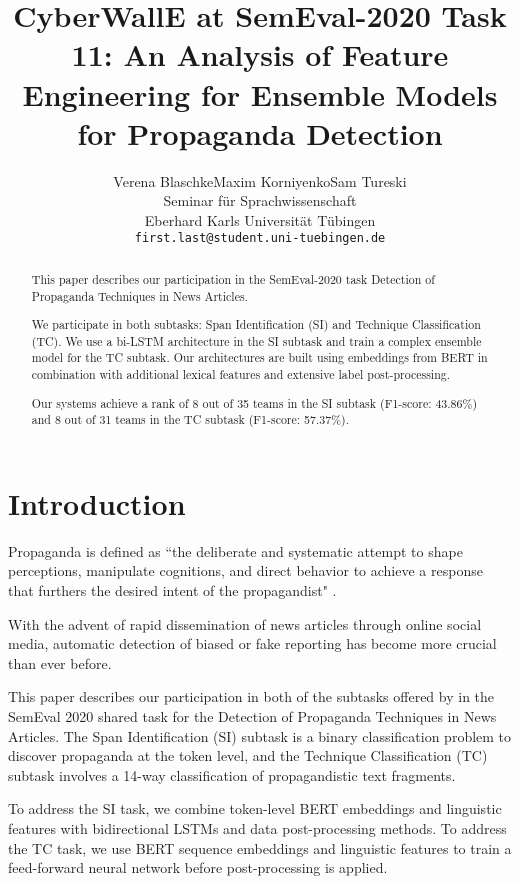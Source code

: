 \documentclass[11pt]{article}
\title{CyberWallE at SemEval-2020 Task 11: An Analysis of Feature Engineering for Ensemble Models for Propaganda Detection}
\author{Verena Blaschke\qquad Maxim Korniyenko\qquad Sam Tureski\\
Seminar f\"{u}r Sprachwissenschaft\\
Eberhard Karls Universit\"{a}t T\"{u}bingen\\
{\tt first.last@student.uni-tuebingen.de}}
\date{}
\begin{document}
\maketitle
{}
\begin{abstract}

This paper describes our participation in the SemEval-2020 task Detection of Propaganda Techniques in News Articles.

We participate in both subtasks: Span Identification (SI) and Technique Classification (TC).
We use a bi-LSTM architecture in the SI subtask and train a complex ensemble model for the TC subtask.
Our architectures are built using embeddings from BERT in  combination with additional lexical features and extensive label post-processing.

Our systems achieve a rank of 8 out of 35 teams in the SI subtask (F1-score: 43.86\%) and 8 out of 31 teams in the TC subtask (F1-score: 57.37\%).

\end{abstract}

\section{Introduction}


Propaganda is defined as ``the deliberate and systematic attempt to shape perceptions, manipulate cognitions, and direct behavior to achieve a response that furthers the desired intent of the propagandist" \cite[p.~6]{jowett2019propaganda}.

With the advent of rapid dissemination of news articles through online social media, automatic detection of biased or fake reporting has become more crucial than ever before. 


This paper describes our participation in both of the subtasks offered by  in the SemEval 2020 shared task for the Detection of Propaganda Techniques in News Articles. The Span Identification (SI) subtask is a binary classification problem to discover propaganda at the token level, and the Technique Classification (TC) subtask involves a 14-way classification of propagandistic text fragments. 

To address the SI task, we combine token-level BERT embeddings and linguistic features with bidirectional LSTMs and data post-processing methods. 
To address the TC task, we use BERT sequence embeddings and linguistic features to train a feed-forward neural network before post-processing is applied. 
\end{document}
